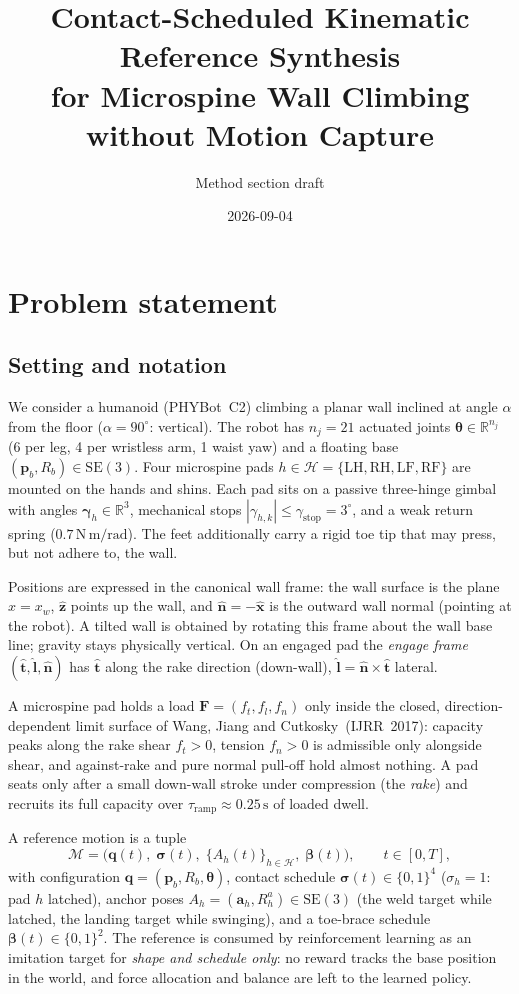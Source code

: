 \documentclass[11pt]{article}
\title{Contact-Scheduled Kinematic Reference Synthesis\\for Microspine Wall Climbing without Motion Capture}
\author{Method section draft}
\date{2026-09-04}
\newcommand{\R}{\mathbb{R}}
\newcommand{\SE}{\mathrm{SE}(3)}
\newcommand{\nhat}{\hat{\bm n}}
\newcommand{\that}{\hat{\bm t}}
\newcommand{\lhat}{\hat{\bm l}}
\newcommand{\zhat}{\hat{\bm z}}
\begin{document}
\maketitle

\section{Problem statement}

\subsection{Setting and notation}

We consider a humanoid (PHYBot~C2) climbing a planar wall inclined at angle
$\alpha$ from the floor ($\alpha=90^\circ$: vertical). The robot has
$n_j=21$ actuated joints $\bm\theta\in\R^{n_j}$ (6 per leg, 4 per wristless
arm, 1 waist yaw) and a floating base $(\bm p_b,R_b)\in\SE$. Four microspine
pads $h\in\mathcal H=\{\mathrm{LH},\mathrm{RH},\mathrm{LF},\mathrm{RF}\}$
are mounted on the hands and shins. Each pad sits on a passive three-hinge
gimbal with angles $\bm\gamma_h\in\R^3$, mechanical stops
$|\gamma_{h,k}|\le\gamma_{\mathrm{stop}}=3^\circ$, and a weak return spring
($0.7\,\mathrm{N\,m/rad}$). The feet additionally carry a rigid toe tip that
may press, but not adhere to, the wall.

Positions are expressed in the canonical wall frame: the wall surface is the
plane $x=x_w$, $\zhat$ points up the wall, and $\nhat=-\hat{\bm x}$ is the
outward wall normal (pointing at the robot). A tilted wall is obtained by
rotating this frame about the wall base line; gravity stays physically
vertical. On an engaged pad the \emph{engage frame}
$(\that,\lhat,\nhat)$ has $\that$ along the rake direction (down-wall),
$\lhat=\nhat\times\that$ lateral.

A microspine pad holds a load $\bm F=(f_t,f_l,f_n)$ only inside the closed,
direction-dependent limit surface of Wang, Jiang and Cutkosky~(IJRR~2017):
capacity peaks along the rake shear $f_t>0$, tension $f_n>0$ is admissible
only alongside shear, and against-rake and pure normal pull-off hold almost
nothing. A pad seats only after a small down-wall stroke under compression
(the \emph{rake}) and recruits its full capacity over
$\tau_{\mathrm{ramp}}\approx0.25\,\mathrm s$ of loaded dwell.

A reference motion is a tuple
\begin{equation}
  \mathcal M=\bigl(\bm q(t),\;\bm\sigma(t),\;\{A_h(t)\}_{h\in\mathcal H},\;\bm\beta(t)\bigr),
  \qquad t\in[0,T],
\end{equation}
with configuration $\bm q=(\bm p_b,R_b,\bm\theta)$, contact schedule
$\bm\sigma(t)\in\{0,1\}^{4}$ ($\sigma_h=1$: pad $h$ latched), anchor poses
$A_h=(\bm a_h,R^a_h)\in\SE$ (the weld target while latched, the landing
target while swinging), and a toe-brace schedule $\bm\beta(t)\in\{0,1\}^2$.
The reference is consumed by reinforcement learning as an imitation target
for \emph{shape and schedule only}: no reward tracks the base position in the
world, and force allocation and balance are left to the learned policy.
\end{document}

